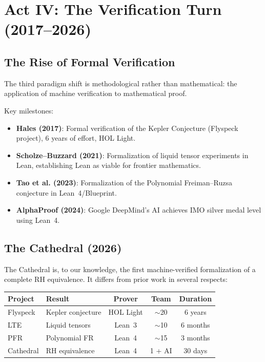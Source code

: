 \documentclass[11pt,a4paper]{article}
\begin{document}
\section{Act IV: The Verification Turn (2017--2026)}

\subsection{The Rise of Formal Verification}

The third paradigm shift is methodological rather than mathematical:
the application of machine verification to mathematical proof.

Key milestones:
\begin{itemize}
  \item \textbf{Hales (2017)}: Formal verification of the Kepler
    Conjecture (Flyspeck project), 6 years of effort, HOL Light.
  \item \textbf{Scholze--Buzzard (2021)}: Formalization of
    liquid tensor experiments in Lean, establishing Lean as viable
    for frontier mathematics.
  \item \textbf{Tao et al. (2023)}: Formalization of the
    Polynomial Freiman--Ruzsa conjecture in Lean~4/Blueprint.
  \item \textbf{AlphaProof (2024)}: Google DeepMind's AI achieves
    IMO silver medal level using Lean~4.
\end{itemize}

\subsection{The Cathedral (2026)}

The Cathedral is, to our knowledge, the first machine-verified
formalization of a complete RH equivalence. It differs from prior
work in several respects:

\begin{center}
\small
\begin{tabular}{@{}llccc@{}}
\toprule
\textbf{Project} & \textbf{Result} & \textbf{Prover} &
\textbf{Team} & \textbf{Duration} \\
\midrule
Flyspeck & Kepler conjecture & HOL Light & $\sim$20 & 6 years \\
LTE & Liquid tensors & Lean~3 & $\sim$10 & 6 months \\
PFR & Polynomial FR & Lean~4 & $\sim$15 & 3 months \\
Cathedral & RH equivalence & Lean~4 & 1 + AI & 30 days \\
\bottomrule
\end{tabular}
\end{center}
\end{document}
